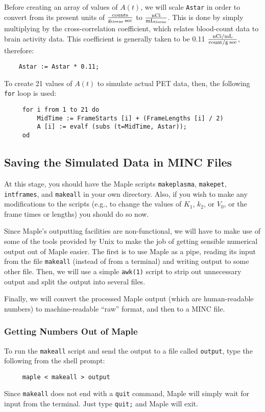 \documentclass[11pt]{article}
\newcommand{\funits}[2]{\mbox{$\rm\frac{#1}{#2}$}}
\begin{document}
Before creating an array of values of $A(t)$, we will scale
\verb|Astar| in order to convert from its present units of
\funits{counts}{g_{tissue}\:sec} to \funits{nCi}{mL_{tissue}}.  This
is done by simply multiplying by the cross-correlation coefficient,
which relates blood-count data to brain activity data.  This
coefficient is generally taken to be 0.11 \funits{nCi / mL}{count / g
\: sec}, therefore:
\begin{verbatim}
    Astar := Astar * 0.11;
\end{verbatim}

To create 21 values of $A(t)$ to simulate actual PET data, then, the
following \verb|for| loop is used:
\begin{verbatim}
     for i from 1 to 21 do
         MidTime := FrameStarts [i] + (FrameLengths [i] / 2)
         A [i] := evalf (subs (t=MidTime, Astar));
     od
\end{verbatim}

\subsection{Saving the Simulated Data in MINC Files}

At this stage, you should have the Maple scripts \verb|makeplasma|,
\verb|makepet|, \verb|intframes|, and \verb|makeall| in your own
directory.  Also, if you wish to make any modifications to the scripts
(e.g., to change the values of $K_1$, $k_2$, or $V_0$, or the frame
times or lengths) you should do so now.

Since Maple's outputting facilities are non-functional, we will have
to make use of some of the tools provided by Unix to make the job of
getting sensible numerical output out of Maple easier.  The first is
to use Maple as a pipe, reading its input from the file \verb|makeall|
(instead of from a terminal) and writing output to some other file.
Then, we will use a simple \verb|awk(1)| script to strip out
unnecessary output and split the output into several files.

Finally, we will convert the processed Maple output (which are
human-readable numbers) to machine-readable ``raw'' format, and then
to a MINC file.

\subsubsection{Getting Numbers Out of Maple}

To run the \verb|makeall| script and send the output to a file called
\verb|output|, type the following from the shell prompt:
\begin{verbatim}
     maple < makeall > output 
\end{verbatim}
Since \verb|makeall| does not end with a \verb|quit| command, Maple
will simply wait for input from the terminal.  Just type \verb|quit;|
and Maple will exit.
\end{document}
